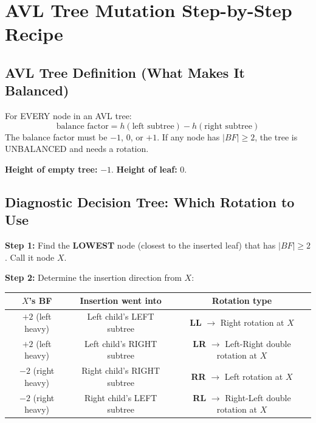 \documentclass[12pt,portrait]{article}
\begin{document}
\newpage

\section{AVL Tree Mutation Step-by-Step Recipe}
\label{sec:avl}

\subsection{AVL Tree Definition (What Makes It Balanced)}

\begin{rulebox}
For EVERY node in an AVL tree:
$$\text{balance factor} = h(\text{left subtree}) - h(\text{right subtree})$$
The balance factor must be $-1$, $0$, or $+1$. If any node has $|BF| \geq 2$, the tree is UNBALANCED and needs a rotation.

\textbf{Height of empty tree:} $-1$. \textbf{Height of leaf:} $0$.
\end{rulebox}

\subsection{Diagnostic Decision Tree: Which Rotation to Use}

\begin{rulebox}
\textbf{Step 1:} Find the \textbf{LOWEST} node (closest to the inserted leaf) that has $|BF| \geq 2$. Call it node $X$.

\textbf{Step 2:} Determine the insertion direction from $X$:

\begin{center}
\begin{tabular}{c|c|c}
\toprule
\textbf{$X$'s BF} & \textbf{Insertion went into} & \textbf{Rotation type} \\
\midrule
$+2$ (left heavy) & Left child's LEFT subtree & \textbf{LL} $\to$ Right rotation at $X$ \\
$+2$ (left heavy) & Left child's RIGHT subtree & \textbf{LR} $\to$ Left-Right double rotation at $X$ \\
$-2$ (right heavy) & Right child's RIGHT subtree & \textbf{RR} $\to$ Left rotation at $X$ \\
$-2$ (right heavy) & Right child's LEFT subtree & \textbf{RL} $\to$ Right-Left double rotation at $X$ \\
\bottomrule
\end{tabular}
\end{center}
\end{rulebox}
\end{document}
